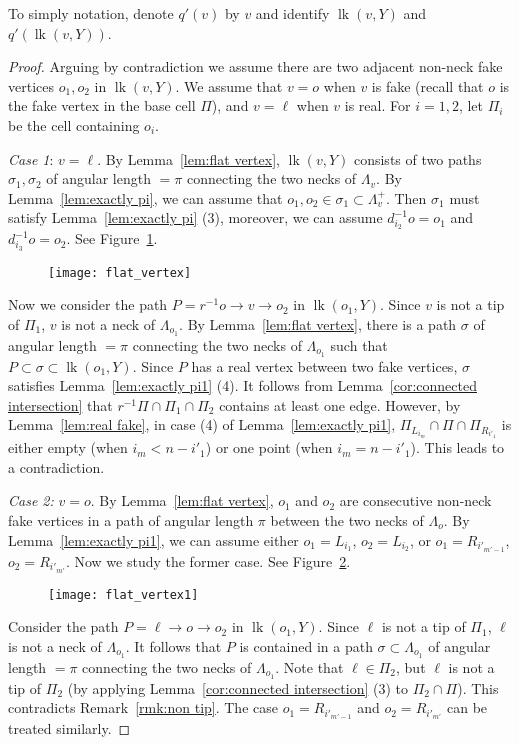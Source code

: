 \documentclass[11pt]{amsart}
\newcommand{\lk}{\operatorname{lk}}
\theoremstyle{definition}
\newcommand{\di}[1]{d_{#1}^{-1}}
\begin{document}
To simply notation, denote $q'(v)$ by $v$ and identify $\lk(v,Y)$ and $q'(\lk(v,Y))$.
\begin{proof}
Arguing by contradiction we assume there are two adjacent non-neck fake vertices $o_1,o_2$ in $\lk(v,Y)$. We assume that $v=o$ when $v$ is fake (recall that $o$ is the fake vertex in the base cell $\Pi$), and $v=\ell$ when $v$ is real. For $i=1,2$, let $\Pi_i$ be the cell containing $o_i$.

\emph{Case 1}: $v=\ell$. By Lemma~\ref{lem:flat vertex}, $\lk(v,Y)$ consists of two paths $\sigma_1,\sigma_2$ of angular length $=\pi$ connecting the two necks of $\Lambda_v$. By Lemma~\ref{lem:exactly pi}, we can assume that $o_1,o_2\in\sigma_1\subset\Lambda^+_v$. Then $\sigma_1$ must satisfy Lemma~\ref{lem:exactly pi} (3), moreover, we can assume $\di{i_2}o=o_1$ and $\di{i_3}o=o_2$. See Figure~\ref{f:flat vertex}.
\begin{figure}[h!]
	\centering
	\texttt{[image: flat\_vertex]}
	\caption{}
	\label{f:flat vertex}
\end{figure}

Now we consider the path $P=r^{-1}o\to v\to o_2$ in $\lk(o_1,Y)$. Since $v$ is not a tip of $\Pi_1$, $v$ is not a neck of $\Lambda_{o_1}$. By Lemma~\ref{lem:flat vertex}, there is a path $\sigma$ of angular length $=\pi$ connecting the two necks of $\Lambda_{o_1}$ such that $P\subset\sigma\subset \lk(o_1,Y)$. Since $P$ has a real vertex between two fake vertices, $\sigma$ satisfies Lemma~\ref{lem:exactly pi1} (4). It follows from Lemma~\ref{cor:connected intersection} that $r^{-1}\Pi\cap\Pi_1\cap\Pi_2$ contains at least one edge. However, by Lemma~\ref{lem:real fake}, in case (4) of Lemma~\ref{lem:exactly pi1}, $\Pi_{L_{i_m}}\cap\Pi\cap\Pi_{R_{i'_1}}$ is either empty (when $i_m<n-i'_1$) or one point (when $i_m=n-i'_1$). This leads to a contradiction.

\emph{Case 2:} $v=o$. By Lemma~\ref{lem:flat vertex}, $o_1$ and $o_2$ are consecutive non-neck fake vertices in a path of angular length $\pi$ between the two necks of $\Lambda_o$. By Lemma~\ref{lem:exactly pi1}, we can assume either $o_1=L_{i_1}$, $o_2=L_{i_2}$, or $o_1=R_{i'_{m'-1}}$, $o_2=R_{i'_{m'}}$. Now we study the former case. See Figure~\ref{f:flat vertex1}.
\begin{figure}[h!]
	\centering
	\texttt{[image: flat\_vertex1]}
	\caption{}
	\label{f:flat vertex1}
\end{figure}
Consider the path $P=\ell\to o\to o_2$ in $\lk(o_1,Y)$. Since $\ell$ is not a tip of $\Pi_1$, $\ell$ is not a neck of $\Lambda_{o_1}$. It follows that $P$ is contained in a path $\sigma\subset \Lambda_{o_1}$ of angular length $=\pi$ connecting the two necks of $\Lambda_{o_1}$.  Note that $\ell\in\Pi_2$, but $\ell$ is not a tip of $\Pi_2$ (by applying Lemma~\ref{cor:connected intersection} (3) to $\Pi_2\cap\Pi$). This contradicts Remark~\ref{rmk:non tip}. The case $o_1=R_{i'_{m'-1}}$ and $o_2=R_{i'_{m'}}$ can be treated similarly.
\end{proof}
\end{document}
